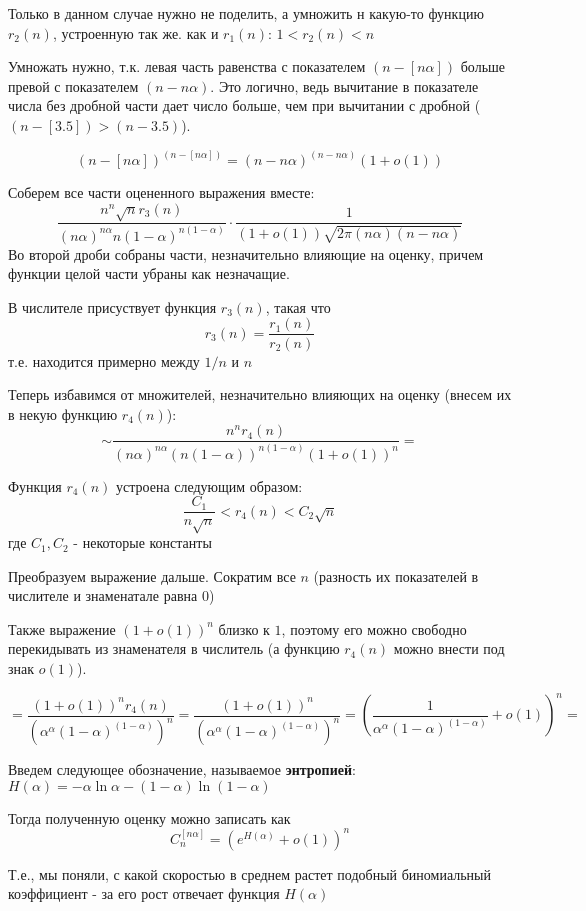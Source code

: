 Только в данном случае нужно не поделить, а умножить н какую-то функцию $ r_2(n) $, устроенную так же. как и $ r_1(n) $: 
$ 1 < r_2(n) < n $

Умножать нужно, т.к. левая часть равенства с показателем 
$ (n -[n \alpha]) $ больше превой с показателем $ (n - n \alpha)$.
Это логично, ведь вычитание в показателе числа без дробной части дает число больше, чем при вычитании с дробной 
($ (n - [3.5]) > (n - 3.5)  $).

$$
(n - [n \alpha])^{(n -[n \alpha])} = (n - n \alpha)^{(n -n \alpha)} (1 + o(1))
$$

Соберем все части оцененного выражения вместе:
$$
\frac{n^{n} \sqrt{n} r_3(n)}
{(n \alpha)^{n \alpha} n(1 - \alpha)^{n(1 - \alpha)}} \cdot
\frac{1}{(1 + o(1)) \sqrt{2 \pi (n \alpha)(n - n \alpha)}}
$$
Во второй дроби собраны части, незначительно влияющие на оценку, причем функции целой части убраны как незначащие.

В числителе присуствует функция $ r_3(n) $, такая что
$$
r_3(n) = \frac{r_1(n)}{r_2(n)}
$$
т.е. находится примерно между $ 1/n $ и $ n $

Теперь избавимся от множителей, незначительно влияющих на оценку (внесем их в некую функцию $ r_4(n) $):
$$
\sim \frac{
n^{n} r_4(n)
}{
(n \alpha)^{n \alpha} (n ( 1 - \alpha ))^{n(1-\alpha)}(1+o(1))^{n}
} =
$$

Функция $ r_4(n) $ устроена следующим образом:
$$
\frac{C_1}{n \sqrt{n}} < r_4(n) < C_2 \sqrt{n}
$$
где $ C_1, C_2 $ - некоторые константы

Преобразуем выражение дальше. Сократим все $ n $ (разность их показателей в числителе и знаменатале равна 0)

Также выражение $ (1 + o(1))^{n} $ близко к $ 1 $, поэтому его можно свободно перекидывать из знаменателя в числитель 
(а функцию $ r_4(n) $ можно внести под знак $ o(1) $).

$$
= 
\frac {
(1 + o(1))^{n} r_4(n) 
}
{ 
(\alpha^{\alpha} (1 - \alpha)^{(1 - \alpha)})^{n}
} 
= 
\frac {
(1 + o(1))^{n}
}
{ 
(\alpha^{\alpha} (1 - \alpha)^{(1 - \alpha)})^{n}
} =
\left( 
\frac{1}{\alpha^{\alpha} (1 - \alpha)^{(1 - \alpha)} } + o(1)
\right)^{n} =
$$

Введем следующее обозначение, называемое \textbf{энтропией}:
$H( \alpha) = 
- \alpha \ln{ \alpha } 
- (1 - \alpha) \ln({1 - \alpha})$

Тогда полученную оценку можно записать как
$$
C_{n}^{[n \alpha]} = (e^{H(\alpha)} + o(1) )^n
$$

Т.е., мы поняли, с какой скоростью в среднем растет подобный биномиальный коэффициент - 
за его рост отвечает функция $ H(\alpha) $

